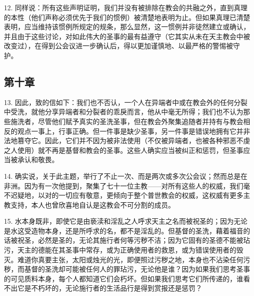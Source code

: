12. 同样说：所有这些声明证明，我们并没有被排除在教会的共融之外，直到真理的本性（他们声称必须优先于我们的惯例）被清楚地表明为止。但如果真理已清楚表明，应当维持该惯例所规定的规条，那么显然，这一惯例并非徒然建立或确认，并且由于这些讨论，对如此伟大的圣事的最有益遵守（它其实从未在天主教会中被改变过），在得到公会议进一步确认后，得以更加谨慎地、以最严格的警惕被守护。\par


\subsection{第十章}

13. 因此，致的信如下：我们也不否认，一个人在异端者中或在教会外的任何分裂中受洗，就他分享异端者和分裂者的乖戾而言，他从中毫无所得；我们也不认为那些施洗者，尽管他们赋予真实的圣洗圣事，但在教会外聚集追随者并持有与教会相反的观点一事上，行事正确。但一件事是缺少圣事，另一件事是错误地拥有它并非法地篡夺它。因此，它们并不因为被非法使用（不仅被异端者，也被各种邪恶不虔之人使用）就不再是基督和教会的圣事。这些人确实应当被纠正和惩罚，但圣事应当被承认和敬畏。\par

14. 确实说，关于此主题，举行了不止一次、而是两次或多次公会议；然而总是在非洲。因为有一次他提到，聚集了七十一位主教——对所有这些人的权威，我们毫不迟疑地，以对的一切应有敬意，更倾向于整个普世教会的权威，这权威有更多主教支持，本人也曾欣喜地自认是这教会不可分割的成员。\par

15. 水本身既非，即使它是由亵渎和淫乱之人呼求天主之名而被祝圣的；因为无论是水这受造物本身，还是所呼求的名，都不是淫乱的。但基督的圣洗，藉着福音的话被祝圣，必然是圣的，无论其施行者何等污秽不洁；因为它固有的圣德不能被玷污，天主的德能在其圣事中常存，或为正确使用者的救恩，或为错误使用者的毁灭。难道你真要主张，太阳或烛光的光，即便照过污秽之地，本身也不沾染任何污秽，而基督的圣洗却可能被任何人的罪玷污，无论他是谁？因为如果我们思考圣事的可见质料本身，每个人都知道它们会朽坏。但如果我们思考它们所传递的，谁看不出它是不朽坏的，无论施行者的生活品行是得到赏报还是惩罚？\par


